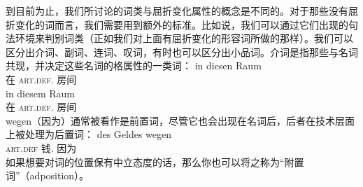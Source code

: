 到目前为止，我们所讨论的词类与屈折变化属性的概念是不同的。对于那些没有屈折变化的词而言，我们需要用到额外的标准。比如说，我们可以通过它们出现的句法环境来判别词类（正如我们对上面有屈折变化的形容词所做的那样）。我们可以区分出介词、副词、连词、叹词，有时也可以区分出小品词。介词是指那些与名词共现，并决定这些名词的格属性的一类词：
\eal
\ex 
\gll in diesen Raum\\
	 在 \textsc{art}.\textsc{def}.\acc{} 房间\\
\ex 
\gll in diesem Raum\\
	 在 \textsc{art}.\textsc{def}.\dat{} 房间\\
\zl
wegen（因为）通常被看作是前置词，尽管它也会出现在名词后，后者在技术层面上被处理为后置词：
\ea
\gll des Geldes wegen\\
	 \textsc{art}.\textsc{def} 钱.\gen{} 因为\\
\z
如果想要对词的位置保有中立态度的话，那么你也可以将之称为“附置词”（adposition）。


